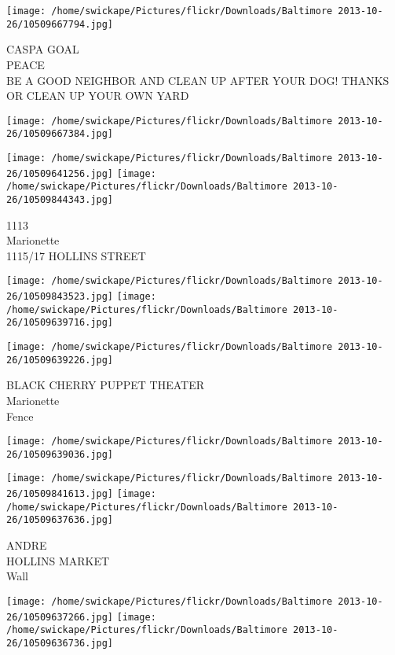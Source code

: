 \documentclass[10pt,letterpaper]{article}
\begin{document}
\texttt{[image: /home/swickape/Pictures/flickr/Downloads/Baltimore 2013-10-26/10509667794.jpg]}

CASPA GOAL\\
PEACE\\
BE A GOOD NEIGHBOR AND CLEAN UP AFTER YOUR DOG! THANKS OR CLEAN UP YOUR OWN YARD\\
\pagebreak

\texttt{[image: /home/swickape/Pictures/flickr/Downloads/Baltimore 2013-10-26/10509667384.jpg]}

\vspace{0.25in}
\texttt{[image: /home/swickape/Pictures/flickr/Downloads/Baltimore 2013-10-26/10509641256.jpg]}
\texttt{[image: /home/swickape/Pictures/flickr/Downloads/Baltimore 2013-10-26/10509844343.jpg]}

1113\\
Marionette\\
1115/17 HOLLINS STREET\\
\pagebreak

\texttt{[image: /home/swickape/Pictures/flickr/Downloads/Baltimore 2013-10-26/10509843523.jpg]}
\texttt{[image: /home/swickape/Pictures/flickr/Downloads/Baltimore 2013-10-26/10509639716.jpg]}

\vspace{0.25in}
\texttt{[image: /home/swickape/Pictures/flickr/Downloads/Baltimore 2013-10-26/10509639226.jpg]}

BLACK CHERRY PUPPET THEATER\\
Marionette\\
Fence\\
\pagebreak

\texttt{[image: /home/swickape/Pictures/flickr/Downloads/Baltimore 2013-10-26/10509639036.jpg]}

\vspace{0.25in}
\texttt{[image: /home/swickape/Pictures/flickr/Downloads/Baltimore 2013-10-26/10509841613.jpg]}
\texttt{[image: /home/swickape/Pictures/flickr/Downloads/Baltimore 2013-10-26/10509637636.jpg]}

ANDRE\\
HOLLINS MARKET\\
Wall\\
\pagebreak

\texttt{[image: /home/swickape/Pictures/flickr/Downloads/Baltimore 2013-10-26/10509637266.jpg]}
\texttt{[image: /home/swickape/Pictures/flickr/Downloads/Baltimore 2013-10-26/10509636736.jpg]}
\end{document}
